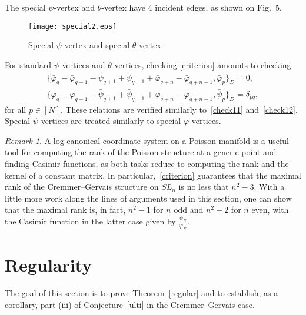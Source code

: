 \documentclass{amsart}
\theoremstyle{definition}
\theoremstyle{remark}
\newtheorem{remark}[theorem]{Remark}
\numberwithin{equation}{section}
\numberwithin{theorem}{section}
\begin{document}
The special ${{\psi}}$-vertex and ${{\theta}}$-vertex have 4 incident edges, as shown on Fig.~5.

\begin{figure}[ht]
\begin{center}
\texttt{[image: special2.eps]}
\caption{Special ${{\psi}}$-vertex and special ${{\theta}}$-vertex}
\label{fig:spec2}
\end{center}
\end{figure}

For standard ${{\psi}}$-vertices and ${{\theta}}$-vertices, checking \eqref{criterion} amounts to checking
\begin{equation*}
\begin{gathered}
\{\bar{{\varphi}}_{q}-\bar{{\varphi}}_{q-1}-\bar{{\psi}}_{q+1}+\bar{{\psi}}_{q-1}+\bar{{\varphi}}_{q+n}-\bar{{\varphi}}_{q+n-1},
 \bar{{\varphi}}_p\}_D=0,\\
 \{\bar{{\varphi}}_{q}-\bar{{\varphi}}_{q-1}-\bar{{\psi}}_{q+1}+\bar{{\psi}}_{q-1}+\bar{{\varphi}}_{q+n}-\bar{{\varphi}}_{q+n-1},
 \bar{{\psi}}_p\}_D=\delta_{pq},
\end{gathered}
\end{equation*}
for all $p\in [N]$. These relations are verified similarly to~\eqref{check11} and~\eqref{check12}. 
Special ${{\psi}}$-vertices are treated similarly to special ${{\varphi}}$-vertices.

\begin{remark}
\label{casimirs}
{\rm A log-canonical coordinate system on a Poisson manifold is a useful tool for computing
the rank of the Poisson structure at a generic point and finding Casimir functions, as both tasks reduce to
computing the rank and the kernel of a constant matrix. In particular,~\eqref{criterion} guarantees that the maximal
rank of the Cremmer--Gervais structure on $SL_n$ is no less that $n^2-3$.
With a little more work along the lines of arguments used in this section, one can show that the maximal rank
is, in fact, $n^2-1$ for $n$ odd and $n^2-2$ for $n$ even, with the Casimir function in the latter case given
by $\frac {{{\psi}}_N} {{{\varphi}}_N}$. 
}
\end{remark}

\section{Regularity}\label{sec:regular}
The goal of this section is to prove Theorem~\ref{regular} and to establish, as a corollary,
part (iii) of Conjecture~\ref{ulti} in the Cremmer--Gervais case. 
\end{document}
